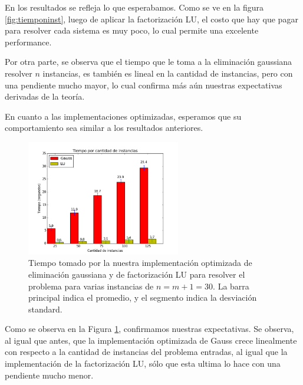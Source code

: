 En los resultados se refleja lo que esperabamos. Como se ve en la figura \ref{fig:tiemponinst}, luego de aplicar la factorización LU, el costo que hay que pagar para resolver cada sistema es muy poco, lo cual permite una excelente performance.

Por otra parte, se observa que el tiempo que le toma a la eliminación gaussiana resolver $n$ instancias, es también es lineal en la cantidad de instancias, pero con una pendiente mucho mayor, lo cual confirma más aún nuestras expectativas derivadas de la teoría.

En cuanto a las implementaciones optimizadas, esperamos que su comportamiento sea similar a los resultados anteriores.

\begin{figure}[H]
\centering  
 \includegraphics[width=0.6\textwidth]{imgs/tiempos_ninst_opt.png}
 \caption{\footnotesize{Tiempo tomado por la nuestra implementación optimizada de eliminación gaussiana y de factorización LU para resolver el problema para varias instancias de $n = m+1 = 30$. La barra principal indica el promedio, y el segmento indica la desviación standard.}}
\label{fig:tiemponinstopt}
\end{figure}

Como se observa en la Figura \ref{fig:tiemponinstopt}, confirmamos nuestras expectativas. Se observa, al igual que antes, que la implementación optimizada de Gauss crece linealmente con respecto a la cantidad de instancias del problema entradas, al igual que la implementación de la factorización LU, sólo que esta ultima lo hace con una pendiente mucho menor.



